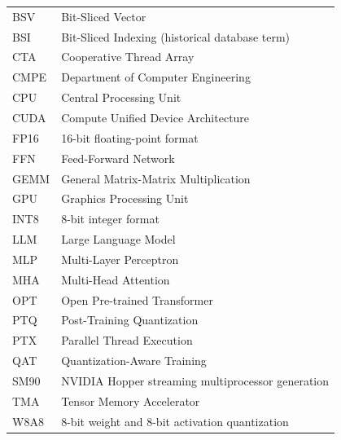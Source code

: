 {
\singlespace
\renewcommand{\arraystretch}{1.2}%
\begin{tabularx}{\linewidth}{ l X }
  BSV & Bit-Sliced Vector \\
  BSI & Bit-Sliced Indexing (historical database term) \\
  CTA & Cooperative Thread Array \\
  CMPE & Department of Computer Engineering \\
  CPU & Central Processing Unit \\
  CUDA & Compute Unified Device Architecture \\
  FP16 & 16-bit floating-point format \\
  FFN & Feed-Forward Network \\
  GEMM & General Matrix-Matrix Multiplication \\
  GPU & Graphics Processing Unit \\
  INT8 & 8-bit integer format \\
  LLM & Large Language Model \\
  MLP & Multi-Layer Perceptron \\
  MHA & Multi-Head Attention \\
  OPT & Open Pre-trained Transformer \\
  PTQ & Post-Training Quantization \\
  PTX & Parallel Thread Execution \\
  QAT & Quantization-Aware Training \\
  SM90 & NVIDIA Hopper streaming multiprocessor generation \\
  TMA & Tensor Memory Accelerator \\
  W8A8 & 8-bit weight and 8-bit activation quantization \\
\end{tabularx}
}
